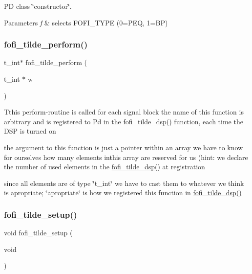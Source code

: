PD class \char`\"{}constructor\char`\"{}. 


\begin{DoxyParams}{Parameters}
{\em f} & selects F\+O\+F\+I\+\_\+\+T\+Y\+PE (0=P\+EQ, 1=BP) \\
\hline
\end{DoxyParams}
\mbox{\label{fofi~_8c_addff81b941469be60d263c2df0493f50}} 
\subsubsection{\texorpdfstring{fofi\_tilde\_perform()}{fofi\_tilde\_perform()}}
{\footnotesize\ttfamily t\+\_\+int$\ast$ fofi\+\_\+tilde\+\_\+perform (\begin{DoxyParamCaption}\item[{t\+\_\+int $\ast$}]{w }\end{DoxyParamCaption})}

Tthis perform-\/routine is called for each signal block the name of this function is arbitrary and is registered to Pd in the \mbox{\hyperlink{fofi~_8h_aff2a8eab6867563a3613be7a34908bb2}{fofi\+\_\+tilde\+\_\+dsp()}} function, each time the D\+SP is turned on

the argument to this function is just a pointer within an array we have to know for ourselves how many elements inthis array are reserved for us (hint\+: we declare the number of used elements in the \mbox{\hyperlink{fofi~_8h_aff2a8eab6867563a3613be7a34908bb2}{fofi\+\_\+tilde\+\_\+dsp()}} at registration

since all elements are of type \char`\"{}t\+\_\+int\char`\"{} we have to cast them to whatever we think is apropriate; \char`\"{}apropriate\char`\"{} is how we registered this function in \mbox{\hyperlink{fofi~_8h_aff2a8eab6867563a3613be7a34908bb2}{fofi\+\_\+tilde\+\_\+dsp()}} \mbox{\label{fofi~_8c_a7dd6882540d4beb229f7604500e7ef47}} 
\subsubsection{\texorpdfstring{fofi\_tilde\_setup()}{fofi\_tilde\_setup()}}
{\footnotesize\ttfamily void fofi\+\_\+tilde\+\_\+setup (\begin{DoxyParamCaption}\item[{void}]{ }\end{DoxyParamCaption})}

